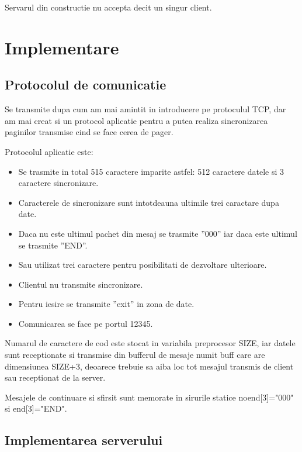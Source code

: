 \documentclass{report}
\begin{document}
Servarul din constructie nu accepta decit un singur client.

\chapter{Implementare}

\section{Protocolul de comunicatie}

\hspace{5mm}Se transmite dupa cum am mai amintit in introducere pe
protoculul TCP, dar am mai creat si un protocol aplicatie pentru a putea
realiza sincronizarea paginilor transmise cind se face cerea de pager.

Protocolul aplicatie este:

\begin{itemize}
\item  Se trasmite in total 515 caractere imparite astfel: 512 caractere
datele si 3 caractere sincronizare.

\item  Caracterele de sincronizare sunt intotdeauna ultimile trei caractare
dupa date.

\item  Daca nu este ultimul pachet din mesaj se trasmite ''000'' iar daca
este ultimul se trasmite ''END''.

\item  Sau utilizat trei caractere pentru posibilitati de dezvoltare
ulterioare.

\item  Clientul nu transmite sincronizare.

\item  Pentru iesire se transmite ''exit'' in zona de date.

\item  Comunicarea se face pe portul 12345.
\end{itemize}

Numarul de caractere de cod este stocat in variabila preprocesor SIZE, iar
datele sunt receptionate si transmise din bufferul de mesaje numit buff care
are dimensiunea SIZE+3, deoarece trebuie sa aiba loc tot mesajul transmis de
client sau receptionat de la server.

Mesajele de continuare si sfirsit sunt memorate in sirurile statice
noend[3]="000" si end[3]="END".

\section{Implementarea serverului}
\end{document}
